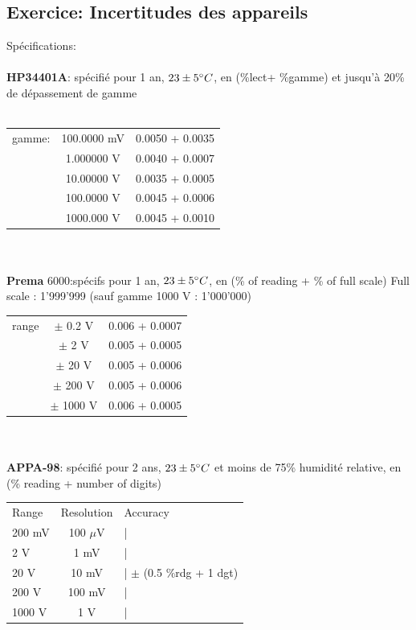 \subsection{Exercice: Incertitudes des appareils }
Spécifications:\\
\\
\textbf{HP34401A}: spécifié pour 1 an, $23 \pm 5 \degree C$, en (\%lect+ \%gamme) et jusqu'à 20\% de dépassement de gamme\\
\\
\begin{tabular}{l c c}
\hline
gamme: 	& 100.0000 mV	& 0.0050 + 0.0035 \\
		& 1.000000 V	& 0.0040 + 0.0007 \\
    	& 10.00000 V	& 0.0035 + 0.0005 \\
		& 100.0000 V	& 0.0045 + 0.0006 \\
		& 1000.000 V	& 0.0045 + 0.0010 \\
\hline
\end{tabular}
\\
\\
\textbf{Prema} 6000:spécifs pour 1 an, $23 \pm 5 \degree C$, en (\% of reading + \% of full scale)
	Full scale : 1'999'999 (sauf gamme 1000 V : 1'000'000)
\\
\begin{tabular}{lcc}
\hline
range & $\pm$ 0.2 V & 0.006 + 0.0007 \\
	& $\pm$ 2 V	& 0.005 + 0.0005 \\
	& $\pm$ 20 V	& 0.005 + 0.0006 \\
	& $\pm$ 200 V	& 0.005 + 0.0006 \\
	& $\pm$ 1000 V	& 0.006 + 0.0005 \\
\hline
\end{tabular}
\\
\\
\textbf{APPA-98}: spécifié pour 2 ans, $23 \pm 5 \degree C$ et moins de 75\% humidité relative, en (\% reading + number of digits)
\\
\begin{tabular}{lcl}
\hline
	Range	& Resolution	& Accuracy \\
	200 mV	& 100 $\mu$V	& | \\
	2 V	& 1 mV	& | \\
	20 V	& 10 mV	& |  $\pm$ (0.5 \%rdg + 1 dgt) \\
	200 V	& 100 mV	& | \\
	1000 V	& 1 V	& | \\
\hline
\end{tabular}
\\

